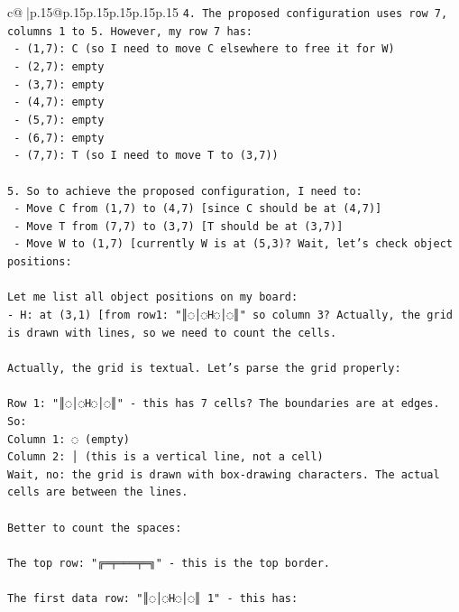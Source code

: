 \documentclass{article}
\begin{document}
{\begin{supertabular}{c@{$\;$}|p{.15\linewidth}@{}p{.15\linewidth}p{.15\linewidth}p{.15\linewidth}p{.15\linewidth}p{.15\linewidth}}
{{{\texttt{4. The proposed configuration uses row 7, columns 1 to 5. However, my row 7 has:} \\
\texttt{   {-} (1,7): C (so I need to move C elsewhere to free it for W)} \\
\texttt{   {-} (2,7): empty} \\
\texttt{   {-} (3,7): empty} \\
\texttt{   {-} (4,7): empty} \\
\texttt{   {-} (5,7): empty} \\
\texttt{   {-} (6,7): empty} \\
\texttt{   {-} (7,7): T (so I need to move T to (3,7))} \\
\\ 
\texttt{5. So to achieve the proposed configuration, I need to:} \\
\texttt{   {-} Move C from (1,7) to (4,7) {[}since C should be at (4,7){]}} \\
\texttt{   {-} Move T from (7,7) to (3,7) {[}T should be at (3,7){]}} \\
\texttt{   {-} Move W to (1,7) {[}currently W is at (5,3)? Wait, let's check object positions:} \\
\\ 
\texttt{Let me list all object positions on my board:} \\
\texttt{{-} H: at (3,1) {[}from row1: "║◌│◌H◌│◌║" so column 3? Actually, the grid is drawn with lines, so we need to count the cells.} \\
\\ 
\texttt{Actually, the grid is textual. Let's parse the grid properly:} \\
\\ 
\texttt{Row 1: "║◌│◌H◌│◌║" {-} this has 7 cells? The boundaries are at edges. So:} \\
\texttt{Column 1: ◌ (empty)} \\
\texttt{Column 2: │ (this is a vertical line, not a cell)} \\
\texttt{Wait, no: the grid is drawn with box{-}drawing characters. The actual cells are between the lines.} \\
\\ 
\texttt{Better to count the spaces:} \\
\\ 
\texttt{The top row: "╔═╤═══╤═╗" {-} this is the top border.} \\
\\ 
\texttt{The first data row: "║◌│◌H◌│◌║ 1" {-} this has:} \\
}}}
\end{supertabular}}
\end{document}
